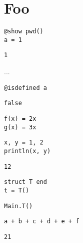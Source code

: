 \chapter{Foo}



\label{374450266380008264}{}



\begin{lstlisting}[]
@show pwd()
a = 1
\end{lstlisting}


\begin{lstlisting}[]
1
\end{lstlisting}



...




\begin{lstlisting}[]
@isdefined a
\end{lstlisting}


\begin{lstlisting}[]
false
\end{lstlisting}




\begin{lstlisting}[]
f(x) = 2x
g(x) = 3x
\end{lstlisting}




\begin{lstlisting}[]
x, y = 1, 2
println(x, y)
\end{lstlisting}


\begin{lstlisting}[]
12
\end{lstlisting}




\begin{lstlisting}[]
struct T end
t = T()
\end{lstlisting}


\begin{lstlisting}[]
Main.T()
\end{lstlisting}




\begin{lstlisting}[]
a + b + c + d + e + f
\end{lstlisting}


\begin{lstlisting}[]
21
\end{lstlisting}



